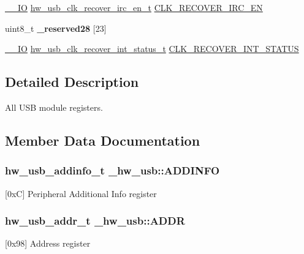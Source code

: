 \begin{DoxyCompactItemize}
\item 
\hyperlink{core__sc300_8h_aec43007d9998a0a0e01faede4133d6be}{\+\_\+\+\_\+\+IO} \hyperlink{union__hw__usb__clk__recover__irc__en}{hw\+\_\+usb\+\_\+clk\+\_\+recover\+\_\+irc\+\_\+en\+\_\+t} \hyperlink{struct__hw__usb_a0aeb7d516ab6266f25f6cfe5939430db}{C\+L\+K\+\_\+\+R\+E\+C\+O\+V\+E\+R\+\_\+\+I\+R\+C\+\_\+\+EN}
\item 
uint8\+\_\+t {\bfseries \+\_\+reserved28} \mbox{[}23\mbox{]}\hypertarget{struct__hw__usb_a333a3f5c5ff4464f681ffb4258387542}{}\label{struct__hw__usb_a333a3f5c5ff4464f681ffb4258387542}

\item 
\hyperlink{core__sc300_8h_aec43007d9998a0a0e01faede4133d6be}{\+\_\+\+\_\+\+IO} \hyperlink{union__hw__usb__clk__recover__int__status}{hw\+\_\+usb\+\_\+clk\+\_\+recover\+\_\+int\+\_\+status\+\_\+t} \hyperlink{struct__hw__usb_a894faa12f48d8b400d12efd1f78a7747}{C\+L\+K\+\_\+\+R\+E\+C\+O\+V\+E\+R\+\_\+\+I\+N\+T\+\_\+\+S\+T\+A\+T\+US}
\end{DoxyCompactItemize}


\subsection{Detailed Description}
All U\+SB module registers. 

\subsection{Member Data Documentation}
\subsubsection[{\texorpdfstring{A\+D\+D\+I\+N\+FO}{ADDINFO}}]{ {\bf hw\+\_\+usb\+\_\+addinfo\+\_\+t} \+\_\+hw\+\_\+usb\+::\+A\+D\+D\+I\+N\+FO}\hypertarget{struct__hw__usb_a1c9f97bf342a7856ed85df0ad2d73876}{}\label{struct__hw__usb_a1c9f97bf342a7856ed85df0ad2d73876}
\mbox{[}0xC\mbox{]} Peripheral Additional Info register 
\subsubsection[{\texorpdfstring{A\+D\+DR}{ADDR}}]{ {\bf hw\+\_\+usb\+\_\+addr\+\_\+t} \+\_\+hw\+\_\+usb\+::\+A\+D\+DR}\hypertarget{struct__hw__usb_a9b0b2a13d67a7ea8deac6a33dcfa7af8}{}\label{struct__hw__usb_a9b0b2a13d67a7ea8deac6a33dcfa7af8}
\mbox{[}0x98\mbox{]} Address register 
